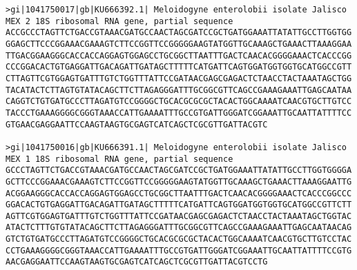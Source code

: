 \documentclass[11pt]{article}
\begin{document}
    \begin{Verbatim}[commandchars=\\\{\}]
>gi|1041750017|gb|KU666392.1| Meloidogyne enterolobii isolate Jalisco MEX 2 18S ribosomal RNA gene, partial sequence
ACCGCCCTAGTTCTGACCGTAAACGATGCCAACTAGCGATCCGCTGATGGAAATTATATTGCCTTGGTGG
GGAGCTTCCCGGAAACGAAAGTCTTCCGGTTCCGGGGGAAGTATGGTTGCAAAGCTGAAACTTAAAGGAA
TTGACGGAAGGGCACCACCAGGAGTGGAGCCTGCGGCTTAATTTGACTCAACACGGGGAAACTCACCCGG
CCCGGACACTGTGAGGATTGACAGATTGATAGCTTTTTCATGATTCAGTGGATGGTGGTGCATGGCCGTT
CTTAGTTCGTGGAGTGATTTGTCTGGTTTATTCCGATAACGAGCGAGACTCTAACCTACTAAATAGCTGG
TACATACTCTTAGTGTATACAGCTTCTTAGAGGGATTTGCGGCGTTCAGCCGAAAGAAATTGAGCAATAA
CAGGTCTGTGATGCCCTTAGATGTCCGGGGCTGCACGCGCGCTACACTGGCAAAATCAACGTGCTTGTCC
TACCCTGAAAGGGGCGGGTAAACCATTGAAAATTTGCCGTGATTGGGATCGGAAATTGCAATTATTTTCC
GTGAACGAGGAATTCCAAGTAAGTGCGAGTCATCAGCTCGCGTTGATTACGTC

>gi|1041750016|gb|KU666391.1| Meloidogyne enterolobii isolate Jalisco MEX 1 18S ribosomal RNA gene, partial sequence
GCCCTAGTTCTGACCGTAAACGATGCCAACTAGCGATCCGCTGATGGAAATTATATTGCCTTGGTGGGGA
GCTTCCCGGAAACGAAAGTCTTCCGGTTCCGGGGGAAGTATGGTTGCAAAGCTGAAACTTAAAGGAATTG
ACGGAAGGGCACCACCAGGAGTGGAGCCTGCGGCTTAATTTGACTCAACACGGGGAAACTCACCCGGCCC
GGACACTGTGAGGATTGACAGATTGATAGCTTTTTCATGATTCAGTGGATGGTGGTGCATGGCCGTTCTT
AGTTCGTGGAGTGATTTGTCTGGTTTATTCCGATAACGAGCGAGACTCTAACCTACTAAATAGCTGGTAC
ATACTCTTTGTGTATACAGCTTCTTAGAGGGATTTGCGGCGTTCAGCCGAAAGAAATTGAGCAATAACAG
GTCTGTGATGCCCTTAGATGTCCGGGGCTGCACGCGCGCTACACTGGCAAAATCAACGTGCTTGTCCTAC
CCTGAAAGGGGCGGGTAAACCATTGAAAATTTGCCGTGATTGGGATCGGAAATTGCAATTATTTTCCGTG
AACGAGGAATTCCAAGTAAGTGCGAGTCATCAGCTCGCGTTGATTACGTCCTG


\end{Verbatim}
\end{document}

